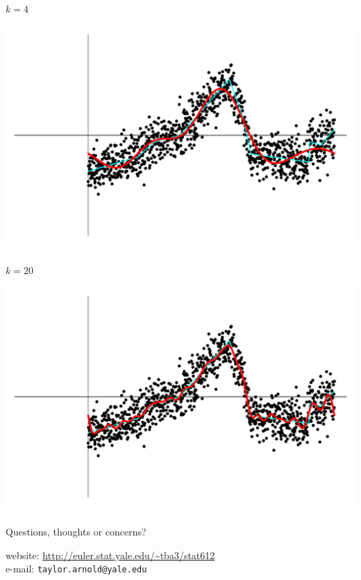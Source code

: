 \begin{frame}[fragile] \frametitle{}

$k=4$

\includegraphics[width=\linewidth]{img/fig09.pdf}

\end{frame}

\begin{frame}[fragile] \frametitle{}

$k=20$

\includegraphics[width=\linewidth]{img/fig10.pdf}

\end{frame}

\begin{frame}[fragile] \frametitle{}

{\color{yaleblue}\fontsize{16pt}{20pt}\selectfont Questions, thoughts or concerns?} \pause

website: \url{http://euler.stat.yale.edu/~tba3/stat612} \\
e-mail: {\tt taylor.arnold{@}yale.edu}


\end{frame}
















